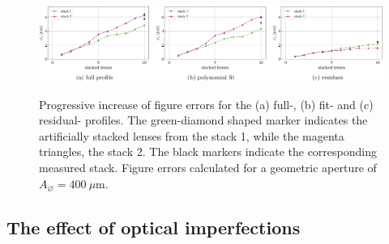 \begin{refsection}
\begin{figure}[t]
    \centering
    {\includegraphics[width=1.\linewidth]{figures/ch04b/stacking_errors.pdf}}
    \caption[Accumulative figure errors]{Progressive increase of figure errors for the (a) full-, (b) fit- and (c) residual- profiles. The green-diamond shaped marker indicates the artificially stacked lenses from the stack 1, while the magenta triangles, the stack 2. The black markers indicate the corresponding measured stack. Figure errors calculated for a geometric aperture of $A_{\diameter}=400~\mu\text{m}$.}
    \label{fig:stacking_errors}
\end{figure}

\subsection{The effect of optical imperfections}\label{section:discussion_imperfections}


\end{refsection}
